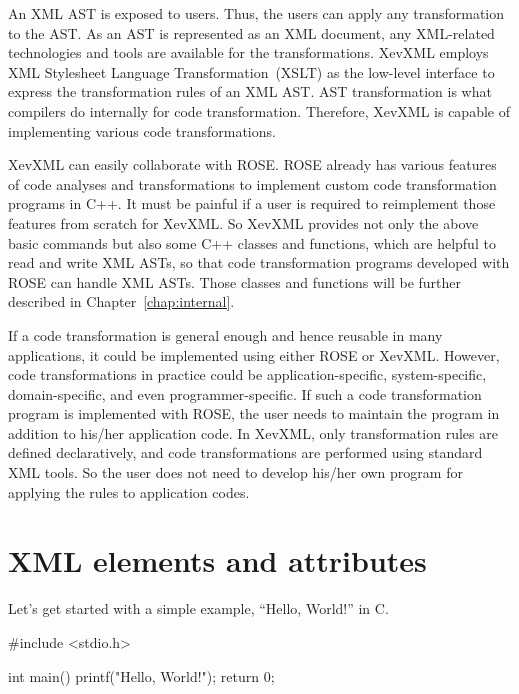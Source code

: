 An XML AST is exposed to users. Thus, the users can apply any
transformation to the AST. As an AST is represented as an XML document,
any XML-related technologies and tools are available for the
transformations. XevXML employs XML Stylesheet Language
Transformation~(XSLT) as the low-level interface to express the
transformation rules of an XML AST.  AST transformation is what
compilers do internally for code transformation. Therefore, XevXML is
capable of implementing various code transformations.

XevXML can easily collaborate with ROSE.  ROSE already has various
features of code analyses and transformations to implement custom code
transformation programs in C++.  It must be painful if a user is
required to reimplement those features from scratch for XevXML. So
XevXML provides not only the above basic commands but also some C++
classes and functions, which are helpful to read and write XML ASTs, so
that code transformation programs developed with ROSE can handle XML
ASTs. Those classes and functions will be further described in
Chapter~\ref{chap:internal}.

If a code transformation is general enough and hence reusable in many
applications, it could be implemented using either ROSE or XevXML.
However, code transformations in practice could be application-specific,
system-specific, domain-specific, and even programmer-specific. If such
a code transformation program is implemented with ROSE, the user needs
to maintain the program in addition to his/her application code. In
XevXML, only transformation rules are defined declaratively, and code
transformations are performed using standard XML tools. So the user does
not need to develop his/her own program for applying the rules to
application codes.






\section{XML elements and attributes}\label{sec:xml}
Let's get started with a simple example, ``Hello, World!'' in C.
\begin{framed}
\begin{src}
#include <stdio.h>

int main()
{
  printf("Hello, World!\n");
  return 0;
}
\end{src}
\end{framed}


